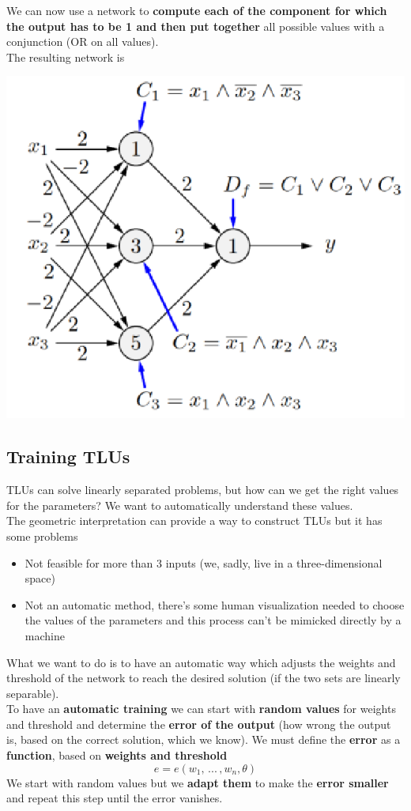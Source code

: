 \documentclass[11pt]{article}
\begin{document}
		We can now use a network to \textbf{compute each of the component for which the output has to be 1 and then put together} all possible values with a conjunction (OR on all values).\\
		
		The resulting network is
		\begin{center}
			\includegraphics[width=0.6\columnwidth]{img/NN/ABF2}
		\end{center}
		
		
		\newpage
		
		\subsection{Training TLUs}
		TLUs can solve linearly separated problems, but how can we get the right values for the parameters? We want to automatically understand these values.\\
		The geometric interpretation can provide a way to construct TLUs but it has some problems
		\begin{itemize}
			\item Not feasible for more than 3 inputs (we, sadly, live in a three-dimensional space)
			\item Not an automatic method, there's some human visualization needed to choose the values of the parameters and this process can't be mimicked directly by a machine
		\end{itemize}
		
		What we want to do is to have an automatic way which adjusts the weights and threshold of the network to reach the desired solution (if the two sets are linearly separable).\\
		
		To have an \textbf{automatic training} we can start with \textbf{random values} for weights and threshold and determine the \textbf{error of the output} (how wrong the output is, based on the correct solution, which we know). We must define the \textbf{error} as a \textbf{function}, based on \textbf{weights and threshold} 
		$$ e = e (w_1, \, ... \, , w_n , \theta) $$
		We start with random values but we \textbf{adapt them} to make the \textbf{error smaller} and repeat this step until the error vanishes.\\
		
\end{document}
